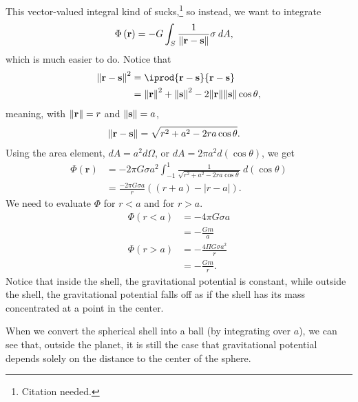 \documentclass[10pt]{mypackage}
\begin{document}
\begin{example}[Gravity]
  This vector-valued integral kind of sucks,\footnote{Citation needed.} so instead, we want to integrate
  \begin{align*}
    \Phi\left(\mathbf{r}\right) &= -G\int_{S}^{} \frac{1}{\norm{\mathbf{r} - \mathbf{s}}}\sigma\:dA,
  \end{align*}
  which is much easier to do. Notice that
  \begin{align*}
    \norm{\mathbf{r} - \mathbf{s}}^2 &= \iprod{\mathbf{r}-\mathbf{s}}{\mathbf{r}-\mathbf{s}}\\
                                     &= \norm{\mathbf{r}}^2 + \norm{\mathbf{s}}^2 - 2\norm{\mathbf{r}}\norm{\mathbf{s}}\cos\theta,
  \end{align*}
  meaning, with $\norm{\mathbf{r}} = r$ and $\norm{\mathbf{s}} = a$,
  \begin{align*}
    \norm{\mathbf{r} - \mathbf{s}} &= \sqrt{r^2 + a^2 - 2ra\cos\theta}.
  \end{align*}
  Using the area element, $dA = a^2d\Omega$, or $dA = 2\pi a^2d\left(\cos\theta\right)$, we get
  \begin{align*}
    \Phi\left(\mathbf{r}\right) &= -2\pi G\sigma a^2\int_{-1}^{1} \frac{1}{\sqrt{r^2 + a^2 - 2ra\cos\theta}}\:d\left(\cos\theta\right)\\
                                &= \frac{-2\pi G\sigma a}{r}\left(\left(r + a\right) - \left\vert r-a \right\vert\right).
  \end{align*}
  We need to evaluate $\Phi$ for $r < a$ and for $r > a$.
  \begin{align*}
    \Phi\left(r < a\right) &= -4\pi G\sigma a\\
                           &= -\frac{Gm}{a}\\
    \Phi\left(r > a\right) &= -\frac{4\Pi G\sigma a^2}{r}\\
                           &= -\frac{Gm}{r}.
  \end{align*}
  Notice that inside the shell, the gravitational potential is constant, while outside the shell, the gravitational potential falls off as if the shell has its mass concentrated at a point in the center.\newline

  When we convert the spherical shell into a ball (by integrating over $a$), we can see that, outside the planet, it is still the case that gravitational potential depends solely on the distance to the center of the sphere.
\end{example}
\end{document}
